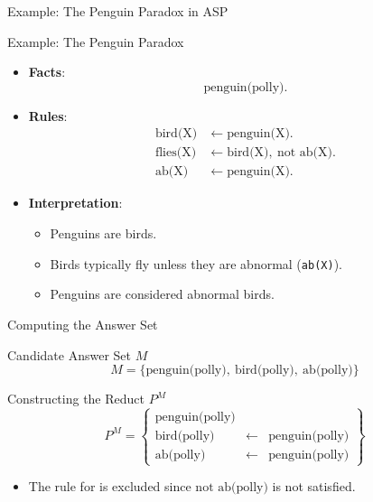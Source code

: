 \begin{frame}{Example: The Penguin Paradox in ASP}
    \begin{exampleblock}{Example: The Penguin Paradox}
        \begin{itemize}
            \item \textbf{Facts}:
                  \[
                      \text{penguin(polly)}.
                  \]
            \item \textbf{Rules}:
                  \begin{align*}
                      \text{bird(X)}  & \leftarrow \text{penguin(X)}.                         \\
                      \text{flies(X)} & \leftarrow \text{bird(X)}, \ \text{not }\text{ab(X)}. \\
                      \text{ab(X)}    & \leftarrow \text{penguin(X)}.
                  \end{align*}
            \item \textbf{Interpretation}:
                  \begin{itemize}
                      \item Penguins are birds.
                      \item Birds typically fly unless they are abnormal (\texttt{ab(X)}).
                      \item Penguins are considered abnormal birds.
                  \end{itemize}
        \end{itemize}
    \end{exampleblock}
\end{frame}

\begin{frame}{Computing the Answer Set}
    \begin{block}{Candidate Answer Set \(M\)}
        \[
            M = \{\text{penguin(polly)},\ \text{bird(polly)},\ \text{ab(polly)}\}
        \]
    \end{block}
    \begin{block}{Constructing the Reduct \(P^M\)}
        \[
            P^M = \left\{
            \begin{array}{lcl}
                \text{penguin(polly)} &            &                       \\
                \text{bird(polly)}    & \leftarrow & \text{penguin(polly)} \\
                \text{ab(polly)}      & \leftarrow & \text{penguin(polly)}
            \end{array}
            \right\}
        \]
        \begin{itemize}
            \item The rule for  is excluded since \(\text{not }\text{ab(polly)}\) is not satisfied.
        \end{itemize}
    \end{block}
\end{frame}

